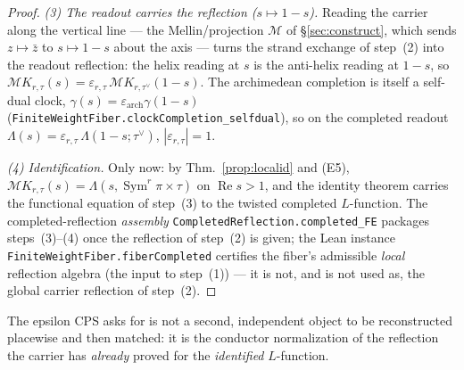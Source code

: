 \documentclass[11pt]{article}
\theoremstyle{definition}
\renewcommand{\Re}{\operatorname{Re}}
\newcommand{\Sym}{\operatorname{Sym}}
\begin{document}
\begin{proof}
\emph{(3) The readout carries the reflection ($s\mapsto1-s$).} Reading the carrier along the vertical line
--- the Mellin/projection $\mathcal M$ of \S\ref{sec:construct}, which sends $z\mapsto\bar z$ to $s\mapsto1-s$
about the axis --- turns the strand exchange of step~(2) into the readout reflection: the helix reading at $s$
is the anti-helix reading at $1-s$, so $\mathcal M K_{r,\tau}(s)=\varepsilon_{r,\tau}\,\mathcal M
K_{r,\tau^\vee}(1-s)$. The archimedean completion is itself a self-dual clock,
$\gamma(s)=\varepsilon_{\mathrm{arch}}\gamma(1-s)$
(\texttt{FiniteWeightFiber.clockCompletion\_selfdual}), so on the completed readout
$\Lambda(s)=\varepsilon_{r,\tau}\,\Lambda(1-s;\tau^\vee)$, $|\varepsilon_{r,\tau}|=1$.

\emph{(4) Identification.} Only now: by Thm.~\ref{prop:localid} and \textup{(E5)},
$\mathcal M K_{r,\tau}(s)=\Lambda(s,\Sym^r\pi\times\tau)$ on $\Re s>1$, and the identity theorem carries
the functional equation of step~(3) to the twisted completed $L$-function. The completed-reflection
\emph{assembly} \texttt{CompletedReflection.completed\_FE} packages steps~(3)--(4) once the reflection of
step~(2) is given; the Lean instance \texttt{FiniteWeightFiber.fiberCompleted} certifies the fiber's
admissible \emph{local} reflection algebra (the input to step~(1)) --- it is not, and is not used as, the
global carrier reflection of step~(2).
\end{proof}

\noindent The epsilon CPS asks for is not a second, independent object to be reconstructed placewise and then
matched: it is the conductor normalization of the reflection the carrier has \emph{already} proved for the
\emph{identified} $L$-function.
\end{document}
